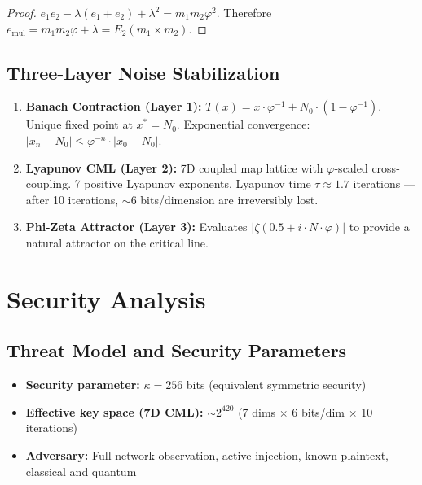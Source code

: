 \documentclass{article}
\begin{document}
\begin{proof}
$e_1 e_2 - \lambda(e_1+e_2) + \lambda^2 = m_1 m_2 \varphi^2$. Therefore $e_{\text{mul}} = m_1 m_2 \varphi + \lambda = E_2(m_1 \times m_2)$.
\end{proof}

\subsection{Three-Layer Noise Stabilization}

\begin{enumerate}
    \item \textbf{Banach Contraction (Layer 1):} $T(x) = x \cdot \varphi^{-1} + N_0 \cdot (1-\varphi^{-1})$. Unique fixed point at $x^* = N_0$. Exponential convergence: $|x_n - N_0| \leq \varphi^{-n} \cdot |x_0 - N_0|$.
    
    \item \textbf{Lyapunov CML (Layer 2):} 7D coupled map lattice with $\varphi$-scaled cross-coupling. 7 positive Lyapunov exponents. Lyapunov time $\tau \approx 1.7$ iterations — after 10 iterations, $\sim$6 bits/dimension are irreversibly lost.
    
    \item \textbf{Phi-Zeta Attractor (Layer 3):} Evaluates $|\zeta(0.5 + i \cdot N \cdot \varphi)|$ to provide a natural attractor on the critical line.
\end{enumerate}

\section{Security Analysis}

\subsection{Threat Model and Security Parameters}

\begin{itemize}
    \item \textbf{Security parameter:} $\kappa = 256$ bits (equivalent symmetric security)
    \item \textbf{Effective key space (7D CML):} $\sim 2^{420}$ (7 dims $\times$ 6 bits/dim $\times$ 10 iterations)
    \item \textbf{Adversary:} Full network observation, active injection, known-plaintext, classical and quantum
\end{itemize}
\end{document}
